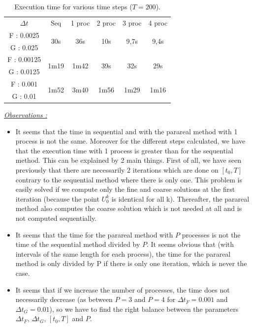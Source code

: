 \begin{table}[H]
	\centering
	\begin{tabular}{| c || c | c | c | c | c |}
		\hline
		\multirow{2}{1.5 cm}{$\Delta t$} & \multirow{2}{1.5 cm}{Seq} & \multirow{2}{1.5 cm}{1 proc} & \multirow{2}{1.5 cm}{2 proc} & \multirow{2}{1.5 cm}{3 proc} &\multirow{2}{1.5 cm}{4 proc} \\
		& & & & & \\
		\hline 
		F : 0.0025 & \multirow{2}{1.5 cm}{30s} & \multirow{2}{1.5 cm}{36s} & \multirow{2}{1.5 cm}{10s} & \multirow{2}{1.5 cm}{9,7s} & \multirow{2}{1.5 cm}{9,4s} \\
		G : 0.025 & & & & & \\
		\hline 
		F : 0.00125 & \multirow{2}{1.5 cm}{1m19} & \multirow{2}{1.5 cm}{1m42} & \multirow{2}{1.5 cm}{39s} & \multirow{2}{1.5 cm}{32s} & \multirow{2}{1.5 cm}{29s} \\
		G : 0.0125 & & & & & \\
		\hline 
		F : 0.001 & \multirow{2}{1.5 cm}{1m52} & \multirow{2}{1.5 cm}{3m40} & \multirow{2}{1.5 cm}{1m56} & \multirow{2}{1.5 cm}{1m29} & \multirow{2}{1.5 cm}{1m16} \\
		G : 0.01 & & & & & \\	 
		\hline
	\end{tabular}
	\caption{Execution time for various time steps ($T=200$).}
	\label{time}
\end{table}

\noindent \underline{\textit{Observations :}} 

\begin{itemize}[label=-]
	\item It seems that the time in sequential and with the parareal method with 1 process is not the same. Moreover for the different steps calculated, we have that the execution time with 1 process is greater than for the sequential method. This can be explained by 2 main things. First of all, we have seen previously that there are necessarily 2 iterations which are done on $[t_0,T]$ contrary to the sequential method where there is only one. This problem is easily solved if we compute only the fine and coarse solutions at the first iteration (because the point $U_0^k$ is identical for all k). Thereafter, the parareal method also computes the coarse solution which is not needed at all and is not computed sequentially.
	\item It seems that the time for the parareal method with $P$ processes is not the time of the sequential method divided by $P$. It seems obvious that (with intervals of the same length for each process), the time for the parareal method is only divided by P if there is only one iteration, which is never the case.
	\item It seems that if we increase the number of processes, the time does not necessarily decrease (as between $P=3$ and $P=4$ for $\Delta t_F=0.001$ and $\Delta t_G=0.01$), so we have to find the right balance between the parameters $\Delta t_F$, $\Delta t_G$, $[t_0,T]$ and $P$.
\end{itemize}

